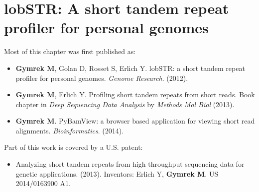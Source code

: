 \chapter{lobSTR: A short tandem repeat profiler for personal genomes}

\hzline

Most of this chapter was first published as:

\begin{itemize}
\item[] \textbf{Gymrek M}, Golan D, Rosset S, Erlich Y. lobSTR: a short tandem repeat profiler for personal genomes. \emph{Genome Research}. (2012).
\item[] \textbf{Gymrek M}, Erlich Y. Profiling short tandem repeats from short reads. Book chapter in \emph{Deep Sequencing Data Analysis} by \emph{Methods Mol Biol} (2013).
\item[] \textbf{Gymrek M}. PyBamView: a browser based application for viewing short read alignments. \emph{Bioinformatics}. (2014).
\end{itemize}

Part of this work is covered by a U.S. patent:

\begin{itemize}
\item[] Analyzing short tandem repeats from high throughput sequencing data for genetic applications. (2013). Inventors: Erlich Y, \textbf{Gymrek M}. US 2014/0163900 A1.
\end{itemize}

\hzline

